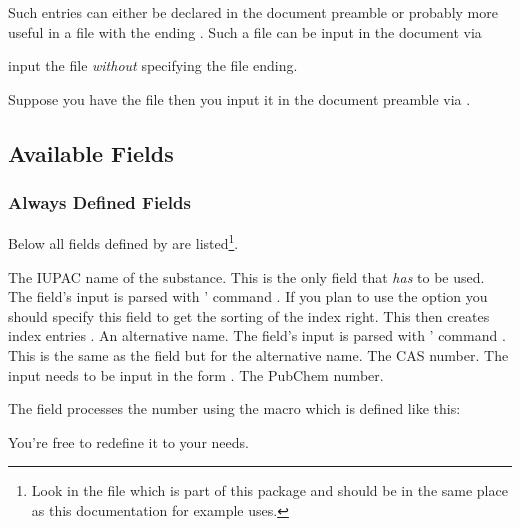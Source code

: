 \documentclass[DIV10,toc=index,toc=bib]{cnpkgdoc}
\begin{document}
Such entries can either be declared in the document preamble or probably
more useful in a file with the ending . Such a file can be input in
the document via
\begin{beschreibung}
  input the file \emph{without} specifying
   the file ending.
\end{beschreibung}
Suppose you have the file  then you input it in the
document preamble via .

\subsection{Available Fields}
\subsubsection{Always Defined Fields}
Below all fields defined by \substances are listed\footnote{Look in the file
 which is part of this package and
should be in the same place as this documentation for example uses.}.
\begin{beschreibung}
 \required The \acs{IUPAC} name of the substance. This is the only
   field that \emph{has} to be used. The field's input is parsed with
   ' command .
 \optional If you plan to use the  option you
   should specify this field to get the sorting of the index right. This then
   creates index entries .
 \optional An alternative name. The field's input is parsed with
   ' command .
 \optional This is the same as the  field but for the
   alternative name.
 \optional The \ac{CAS} number. The input needs to be input in the
   form .
 \optional The PubChem number.
\end{beschreibung}

The  field processes the number using the macro 
which is defined like this:
\begin{beispiel}
 \def\@CAS#1-#2-#3{\iupac{#1\-#2\-#3}}
 \NewDocumentCommand{}
\end{beispiel}
You're free to redefine it to your needs.
\end{document}
